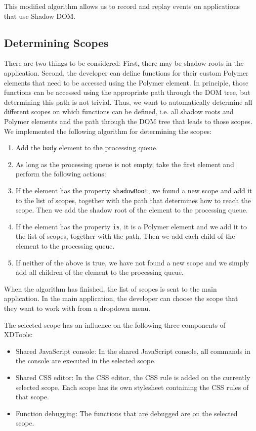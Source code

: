 This modified algorithm allows us to record and replay events on applications that use Shadow DOM. 

\subsection{Determining Scopes}

There are two things to be considered: First, there may be shadow roots in the application. Second, the developer can define functions for their custom Polymer elements that need to be accessed using the Polymer element. In principle, those functions can be accessed using the appropriate path through the DOM tree, but determining this path is not trivial. Thus, we want to automatically determine all different scopes on which functions can be defined, i.e. all shadow roots and Polymer elements and the path through the DOM tree that leads to those scopes. We implemented the following algorithm for determining the scopes:
\begin{enumerate}
	\item Add the \lstinline|body| element to the processing queue.
	\item As long as the processing queue is not empty, take the first element and perform the following actions:
		\item If the element has the property \lstinline|shadowRoot|, we found a new scope and add it to the list of scopes, together with the path that determines how to reach the scope. Then we add the shadow root of the element to the processing queue.
		\item If the element has the property \lstinline|is|, it is a Polymer element and we add it to the list of scopes, together with the path. Then we add each child of the element to the processing queue.
		\item If neither of the above is true, we have not found a new scope and we simply add all children of the element to the processing queue.
\end{enumerate}
When the algorithm has finished, the list of scopes is sent to the main application. In the main application, the developer can choose the scope that they want to work with from a dropdown menu.

The selected scope has an influence on the following three components of XDTools:
\begin{itemize}
	\item Shared JavaScript console: In the shared JavaScript console, all commands in the console are executed in the selected scope. 
	\item Shared CSS editor: In the CSS editor, the CSS rule is added on the currently selected scope. Each scope has its own stylesheet containing the CSS rules of that scope.
	\item Function debugging: The functions that are debugged are on the selected scope.
\end{itemize}
